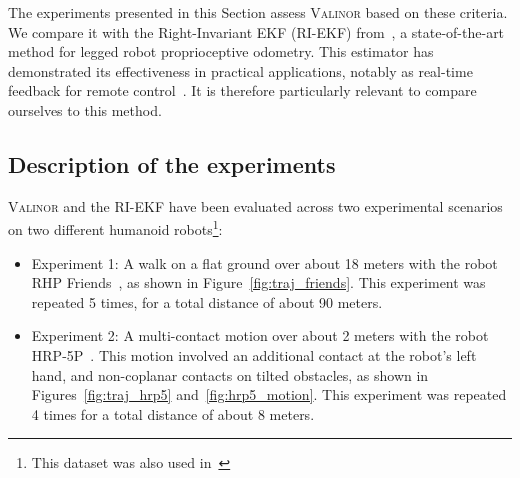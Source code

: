 \documentclass{IJCAS}
\begin{document}
\noindent The experiments presented in this Section assess {\scshape Valinor} based on these criteria. We compare it with the Right-Invariant EKF (RI-EKF) from~\cite{Hartley2020RIEKF}, a state-of-the-art method for legged robot proprioceptive odometry. This estimator has demonstrated its effectiveness in practical applications, notably as real-time feedback for remote control~\cite{Grandia2024DesignControlBipedalRoboticCharacter}. It is therefore particularly relevant to compare ourselves to this method.

\subsection{Description of the experiments}

{\scshape Valinor} and the RI-EKF have been evaluated across two experimental scenarios on two different humanoid robots\footnote{This dataset was also used in~\cite{Demont2024KineticsObserver}}:
\begin{itemize}
    \item Experiment 1: A walk on a flat ground over about 18 meters with the robot RHP Friends~\cite{Benallegue2025RhpFriendsJRL}, as shown in Figure~\ref{fig:traj_friends}. This experiment was repeated 5 times, for a total distance of about 90 meters.
    \item Experiment 2: A multi-contact motion over about 2 meters with the robot HRP-5P~\cite{Kaneko2019Hrp5}. This motion involved an additional contact at the robot's left hand, and non-coplanar contacts on tilted obstacles, as shown in Figures~\ref{fig:traj_hrp5} and~\ref{fig:hrp5_motion}. This experiment was repeated 4 times for a total distance of about 8 meters.
\end{itemize}
\end{document}
